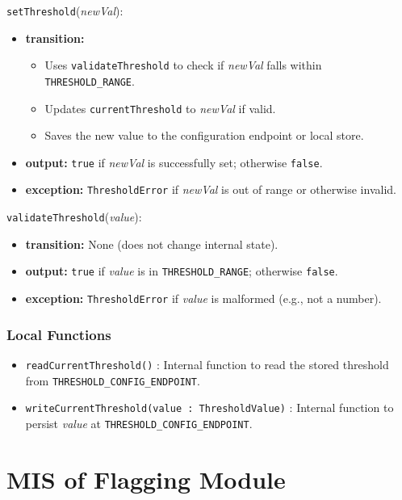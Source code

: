 \documentclass[12pt, titlepage]{article}
\begin{document}
\noindent \texttt{setThreshold}(\textit{newVal}):
\begin{itemize}
    \item \textbf{transition:}
    \begin{itemize}
        \item Uses \texttt{validateThreshold} to check if \textit{newVal} falls within \texttt{THRESHOLD\_RANGE}.
        \item Updates \texttt{currentThreshold} to \textit{newVal} if valid.
        \item Saves the new value to the configuration endpoint or local store.
    \end{itemize}
    \item \textbf{output:} \texttt{true} if \textit{newVal} is successfully set; otherwise \texttt{false}.
    \item \textbf{exception:} \texttt{ThresholdError} if \textit{newVal} is out of range or otherwise invalid.
\end{itemize}

\noindent \texttt{validateThreshold}(\textit{value}):
\begin{itemize}
    \item \textbf{transition:} None (does not change internal state).
    \item \textbf{output:} \texttt{true} if \textit{value} is in \texttt{THRESHOLD\_RANGE}; otherwise \texttt{false}.
    \item \textbf{exception:} \texttt{ThresholdError} if \textit{value} is malformed (e.g., not a number).
\end{itemize}

\subsubsection{Local Functions}

\begin{itemize}
    \item \texttt{readCurrentThreshold()} : Internal function to read the stored threshold from \texttt{THRESHOLD\_CONFIG\_ENDPOINT}.
    \item \texttt{writeCurrentThreshold(value : ThresholdValue)} : Internal function to persist \textit{value} at \texttt{THRESHOLD\_CONFIG\_ENDPOINT}.
\end{itemize}


\section{MIS of Flagging Module} \label{FlagModule}
\end{document}
